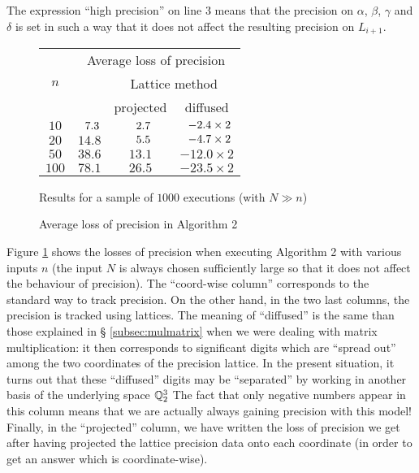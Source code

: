 \documentclass{sig-alternate}
\begin{document}
\noindent
The expression ``high precision'' on line 3 means that the precision on 
$\alpha$, $\beta$, $\gamma$ and $\delta$ is set in such a way that it 
does not affect the resulting precision on $L_{i+1}$.
%
\begin{figure}
\begin{center}
\renewcommand{\arraystretch}{1.2}
\begin{tabular}{|c|c|c|c|}
\hline
\multirow{3}{*}{\hspace{0.2cm}$n$\hspace{0.2cm}} & 
\multicolumn{3}{|c|}{Average loss of precision} \\
\cline{2-4}
& \raisebox{-0.05cm}{Coord-wise} & 
\multicolumn{2}{|c|}{Lattice method} \\
\cline{3-4}
& \raisebox{0.04cm}{method} & 
\hspace{0.2cm}projected\hspace{0.2cm} & 
\hspace{0.2cm}diffused\hspace{0.2cm} \\
\hline 
$10$ & $\hphantom{0}7.3$ & $\hphantom{0}2.7$ & $\hphantom{0}{-}2.4 \times 2$ \\
$20$ & $14.8$ & $\hphantom{0}5.5$ & $\hphantom{0}{-}4.7 \times 2$ \\
$50$ & $38.6$ & $13.1$ & $-12.0 \times 2$ \\
$100$ & $78.1$ & $26.5$ & $-23.5 \times 2$ \\
\hline
\end{tabular}

\smallskip

{\small
Results for a sample of $1000$ executions (with $N \gg n$)}
\end{center}
\renewcommand{\arraystretch}{1}

\vspace{-0.3cm}

\caption{Average loss of precision in Algorithm 2}
\label{fig:vectorspace}
\end{figure}
%
Figure \ref{fig:vectorspace} shows the losses of precision when
executing Algorithm 2 with various inputs $n$ (the input $N$ is
always chosen sufficiently large so that it does not affect the
behaviour of precision). The ``coord-wise column'' corresponds to
the standard way to track precision. On the other hand, in the two 
last columns, the precision is tracked using lattices. The meaning of 
``diffused'' is the same than those explained in \S 
\ref{subsec:mulmatrix} when we were dealing with matrix multiplication: 
it then corresponds to significant digits which are ``spread out'' among 
the two coordinates of the precision lattice. In the present situation,
it turns out that these ``diffused'' digits may be ``separated'' by
working in another basis of the underlying space $\mathbb Q_2^3$
The fact that only negative numbers appear in this column means that we 
are actually always gaining precision with this model! Finally, in the 
``projected'' column, we have written the loss of precision we get after 
having projected the lattice precision data onto each coordinate (in 
order to get an answer which is coordinate-wise).
\end{document}
